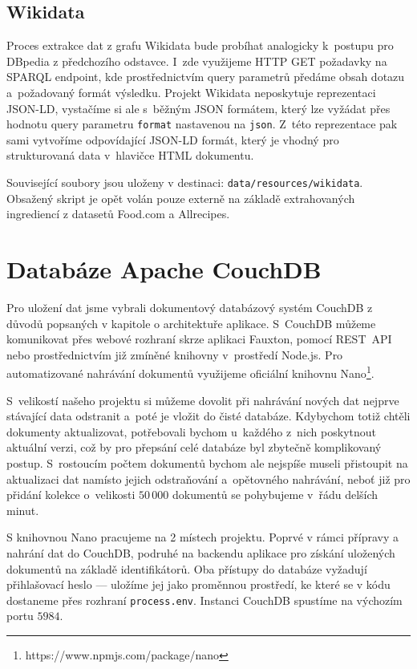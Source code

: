 \subsection{Wikidata}

Proces extrakce dat z grafu Wikidata bude probíhat analogicky k~postupu pro DBpedia z předchozího odstavce. I~zde využijeme HTTP GET požadavky na SPARQL endpoint, kde prostřednictvím query parametrů předáme obsah dotazu a~požadovaný formát výsledku. Projekt Wikidata neposkytuje reprezentaci JSON-LD, vystačíme si ale s~běžným JSON formátem, který lze vyžádat přes hodnotu query parametru \texttt{format} nastavenou na \texttt{json}. Z~této reprezentace pak sami vytvoříme odpovídající JSON-LD formát, který je vhodný pro strukturovaná data v~hlavičce HTML dokumentu.

Související soubory jsou uloženy v destinaci: \texttt{data/resources/wikidata}. Obsažený skript je opět volán pouze externě na základě extrahovaných ingrediencí z datasetů Food.com a Allrecipes. 

\section{Databáze Apache CouchDB}

Pro uložení dat jsme vybrali dokumentový databázový systém CouchDB z důvodů popsaných v kapitole o architektuře aplikace.  S~CouchDB můžeme komunikovat přes webové rozhraní skrze aplikaci Fauxton, pomocí REST~API nebo prostřednictvím již zmíněné knihovny v~prostředí Node.js. Pro automatizované nahrávání dokumentů využijeme oficiální knihovnu Nano\footnote{https://www.npmjs.com/package/nano}.

S~velikostí našeho projektu si můžeme dovolit při nahrávání nových dat nejprve stávající data odstranit a~poté je vložit do čisté databáze. Kdybychom totiž chtěli dokumenty aktualizovat, potřebovali bychom u~každého z~nich poskytnout aktuální verzi, což by pro přepsání celé databáze byl zbytečně komplikovaný postup. S~rostoucím počtem dokumentů bychom ale nejspíše museli přistoupit na aktualizaci dat namísto jejich odstraňování a~opětovného nahrávání, neboť již pro přidání kolekce o~velikosti $50\,000$ dokumentů se pohybujeme v~řádu delších minut.

S knihovnou Nano pracujeme na 2 místech projektu. Poprvé v rámci přípravy a nahrání dat do CouchDB, podruhé na backendu aplikace pro získání uložených dokumentů na základě identifikátorů. Oba přístupy do databáze vyžadují přihlašovací heslo --- uložíme jej jako proměnnou prostředí, ke které se v kódu dostaneme přes rozhraní \texttt{process.env}. Instanci CouchDB spustíme na výchozím portu $5984$.

